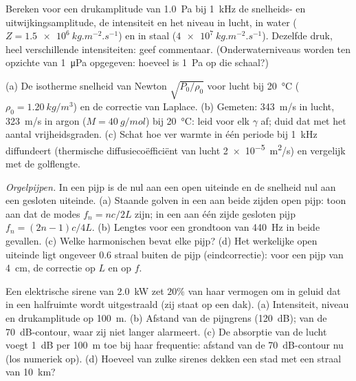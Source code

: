 \begin{exercise}[$\star\star$]\label{exo:b2:sound-waves:6}
Bereken voor een drukamplitude van \qty{1.0}{Pa} bij \qty{1}{kHz} de
snelheids- en uitwijkingsamplitude, de intensiteit en het niveau in lucht,
in water ($Z = \qty{1.5e6}{kg.m^{-2}.s^{-1}}$) en in staal
($\qty{4e7}{kg.m^{-2}.s^{-1}}$). Dezelfde druk, heel verschillende
intensiteiten: geef commentaar. (Onderwaterniveaus worden ten opzichte van
\qty{1}{\micro Pa} opgegeven: hoeveel is \qty{1}{Pa} op die schaal?)
\end{exercise}

\begin{exercise}[$\star\star$]\label{exo:b2:sound-waves:7}
(a) De isotherme snelheid van Newton $\sqrt{P_0/\rho_0}$ voor lucht bij
\qty{20}{\degreeCelsius} ($\rho_0 = \qty{1.20}{kg/m^3}$) en de correctie van
Laplace. (b) Gemeten: \qty{343}{m/s} in lucht, \qty{323}{m/s} in argon
($M = \qty{40}{g/mol}$) bij \qty{20}{\degreeCelsius}: leid voor elk $\gamma$
af; duid dat met het aantal vrijheidsgraden. (c) Schat hoe ver warmte in één
periode bij \qty{1}{kHz} diffundeert (thermische diffusiecoëfficiënt van
lucht \qty{2e-5}{m^2/s}) en vergelijk met de golflengte.
\end{exercise}

\begin{exercise}[$\star\star$]\label{exo:b2:sound-waves:8}
\emph{Orgelpijpen.} In een pijp is de  nul aan een open uiteinde en
de snelheid nul aan een gesloten uiteinde. (a) Staande golven in een aan
beide zijden open pijp: toon aan dat de modes $f_n = nc/2L$ zijn; in een aan
één zijde gesloten pijp $f_n = (2n - 1)c/4L$. (b) Lengtes voor een grondtoon
van \qty{440}{Hz} in beide gevallen. (c) Welke harmonischen bevat elke pijp?
(d) Het werkelijke open uiteinde ligt ongeveer $0.6$ straal buiten de pijp
(eindcorrectie): voor een pijp van \qty{4}{cm}, de correctie op $L$ en op
$f$.
\end{exercise}

\begin{exercise}[$\star\star$]\label{exo:b2:sound-waves:9}
Een elektrische sirene van \qty{2.0}{kW} zet $20\%$ van haar vermogen om in
geluid dat in een halfruimte wordt uitgestraald (zij staat op een dak). (a)
Intensiteit, niveau en drukamplitude op \qty{100}{m}. (b) Afstand van de
pijngrens (\qty{120}{dB}); van de \qty{70}{dB}-contour, waar zij niet langer
alarmeert. (c) De absorptie van de lucht voegt \qty{1}{dB} per \qty{100}{m}
toe bij haar frequentie: afstand van de \qty{70}{dB}-contour nu (los
numeriek op). (d) Hoeveel van zulke sirenes dekken een stad met een straal
van \qty{10}{km}?
\end{exercise}

